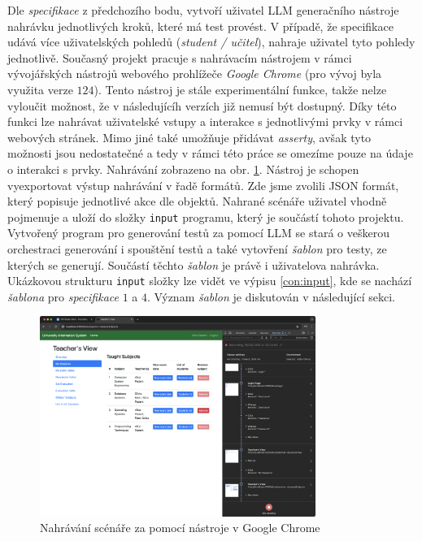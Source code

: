 \documentclass[czech, ma, kiv, he, iso690numb, pdf, viewonly]{fasthesis}
\begin{document}
    Dle \emph{specifikace} z předchozího bodu, vytvoří uživatel LLM generačního nástroje nahrávku jednotlivých kroků, které má test provést. V případě, že specifikace udává více uživatelských pohledů (\textit{student / učitel}), nahraje uživatel tyto pohledy jednotlivě. Současný projekt pracuje s nahrávacím nástrojem v rámci vývojářských nástrojů webového prohlížeče \textit{Google Chrome} (pro vývoj byla využita verze \(124\)). Tento nástroj je stále experimentální funkce, takže nelze vyloučit možnost, že v následujícíh verzích již nemusí být dostupný. Díky této funkci lze nahrávat uživatelské vstupy a interakce s jednotlivými prvky v rámci webových stránek. Mimo jiné také umožňuje přidávat \textit{asserty}, avšak tyto možnosti jsou nedostatečné a tedy v rámci této práce se omezíme pouze na údaje o interakci s prvky. Nahrávání zobrazeno na obr. \ref{fig:chrome_recording}. Nástroj je schopen vyexportovat výstup nahrávání v řadě formátů. Zde jsme zvolili JSON formát, který popisuje jednotlivé akce dle objektů. Nahrané scénáře uživatel vhodně pojmenuje a uloží do složky \verb|input| programu, který je součástí tohoto projektu. Vytvořený program pro generování testů za pomocí LLM se stará o veškerou orchestraci generování i spouštění testů a také vytovření \emph{šablon} pro testy, ze kterých se generují. Součástí těchto \emph{šablon} je právě i uživatelova nahrávka. Ukázkovou strukturu \verb|input| složky lze vidět ve výpisu \ref{con:input}, kde se nachází \emph{šablona} pro \textit{specifikace} \(1\) a \(4\). Význam \emph{šablon} je diskutován v následující sekci.

    \begin{figure}
        \includegraphics[width=0.8\textwidth]{pic/recording.png}
        \centering
        \caption{Nahrávání scénáře za pomocí nástroje v Google Chrome}
        \label{fig:chrome_recording}
    \end{figure}
\end{document}
